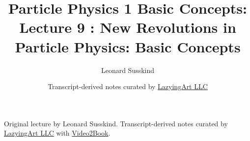 \documentclass[11pt,oneside]{book}
\begin{document}
\frontmatter
\title{Particle Physics 1 Basic Concepts: Lecture 9 : New Revolutions in Particle Physics: Basic Concepts}
\author{Leonard Susskind}
\date{Transcript-derived notes curated by \href{https://lazying.art}{LazyingArt LLC}}
\maketitle
\begin{center}
\small Original lecture by Leonard Susskind. Transcript-derived notes curated by \href{https://lazying.art}{LazyingArt LLC} with \href{https://github.com/lachlanchen/Video2Book}{Video2Book}.
\end{center}
\clearpage
\mainmatter

\end{document}
